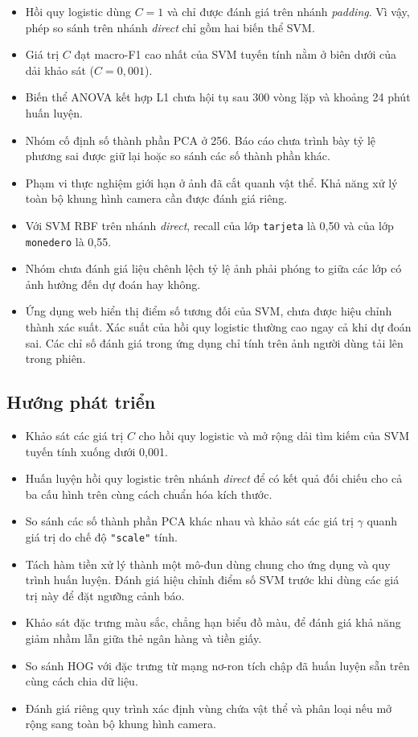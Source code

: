 \begin{itemize}
  \item Hồi quy logistic dùng $C = 1$ và chỉ được đánh giá trên nhánh \emph{padding}. Vì vậy, phép so sánh trên nhánh \emph{direct} chỉ gồm hai biến thể SVM.
  \item Giá trị $C$ đạt macro-F1 cao nhất của SVM tuyến tính nằm ở biên dưới của dải khảo sát ($C = 0{,}001$).
  \item Biến thể ANOVA kết hợp L1 chưa hội tụ sau 300 vòng lặp và khoảng 24 phút huấn luyện.
  \item Nhóm cố định số thành phần PCA ở 256. Báo cáo chưa trình bày tỷ lệ phương sai được giữ lại hoặc so sánh các số thành phần khác.
  \item Phạm vi thực nghiệm giới hạn ở ảnh đã cắt quanh vật thể. Khả năng xử lý toàn bộ khung hình camera cần được đánh giá riêng.
  \item Với SVM RBF trên nhánh \emph{direct}, recall của lớp \texttt{tarjeta} là 0,50 và của lớp \texttt{monedero} là 0,55.
  \item Nhóm chưa đánh giá liệu chênh lệch tỷ lệ ảnh phải phóng to giữa các lớp có ảnh hưởng đến dự đoán hay không.
  \item Ứng dụng web hiển thị điểm số tương đối của SVM, chưa được hiệu chỉnh thành xác suất. Xác suất của hồi quy logistic thường cao ngay cả khi dự đoán sai. Các chỉ số đánh giá trong ứng dụng chỉ tính trên ảnh người dùng tải lên trong phiên.
\end{itemize}

\subsection{Hướng phát triển}

\begin{itemize}
  \item Khảo sát các giá trị $C$ cho hồi quy logistic và mở rộng dải tìm kiếm của SVM tuyến tính xuống dưới 0,001.
  \item Huấn luyện hồi quy logistic trên nhánh \emph{direct} để có kết quả đối chiếu cho cả ba cấu hình trên cùng cách chuẩn hóa kích thước.
  \item So sánh các số thành phần PCA khác nhau và khảo sát các giá trị $\gamma$ quanh giá trị do chế độ \texttt{"scale"} tính.
  \item Tách hàm tiền xử lý thành một mô-đun dùng chung cho ứng dụng và quy trình huấn luyện. Đánh giá hiệu chỉnh điểm số SVM trước khi dùng các giá trị này để đặt ngưỡng cảnh báo.
  \item Khảo sát đặc trưng màu sắc, chẳng hạn biểu đồ màu, để đánh giá khả năng giảm nhầm lẫn giữa thẻ ngân hàng và tiền giấy.
  \item So sánh HOG với đặc trưng từ mạng nơ-ron tích chập đã huấn luyện sẵn trên cùng cách chia dữ liệu.
  \item Đánh giá riêng quy trình xác định vùng chứa vật thể và phân loại nếu mở rộng sang toàn bộ khung hình camera.
\end{itemize}

